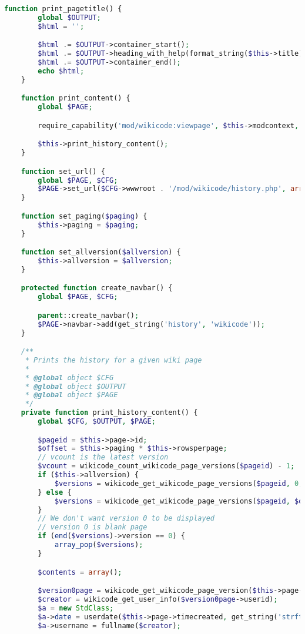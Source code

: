 \begin{lstlisting}[language=PHP]
    function print_pagetitle() {
        global $OUTPUT;
        $html = '';

        $html .= $OUTPUT->container_start();
        $html .= $OUTPUT->heading_with_help(format_string($this->title), 'history', 'wikicode');
        $html .= $OUTPUT->container_end();
        echo $html;
    }

    function print_content() {
        global $PAGE;

        require_capability('mod/wikicode:viewpage', $this->modcontext, NULL, true, 'noviewpagepermission', 'wikicode');

        $this->print_history_content();
    }

    function set_url() {
        global $PAGE, $CFG;
        $PAGE->set_url($CFG->wwwroot . '/mod/wikicode/history.php', array('pageid' => $this->page->id));
    }

    function set_paging($paging) {
        $this->paging = $paging;
    }

    function set_allversion($allversion) {
        $this->allversion = $allversion;
    }

    protected function create_navbar() {
        global $PAGE, $CFG;

        parent::create_navbar();
        $PAGE->navbar->add(get_string('history', 'wikicode'));
    }

    /**
     * Prints the history for a given wiki page
     *
     * @global object $CFG
     * @global object $OUTPUT
     * @global object $PAGE
     */
    private function print_history_content() {
        global $CFG, $OUTPUT, $PAGE;

        $pageid = $this->page->id;
        $offset = $this->paging * $this->rowsperpage;
        // vcount is the latest version
        $vcount = wikicode_count_wikicode_page_versions($pageid) - 1;
        if ($this->allversion) {
            $versions = wikicode_get_wikicode_page_versions($pageid, 0, $vcount);
        } else {
            $versions = wikicode_get_wikicode_page_versions($pageid, $offset, $vcount);
        }
        // We don't want version 0 to be displayed
        // version 0 is blank page
        if (end($versions)->version == 0) {
            array_pop($versions);
        }

        $contents = array();

        $version0page = wikicode_get_wikicode_page_version($this->page->id, 0);
        $creator = wikicode_get_user_info($version0page->userid);
        $a = new StdClass;
        $a->date = userdate($this->page->timecreated, get_string('strftimedaydatetime', 'langconfig'));
        $a->username = fullname($creator);
	

\end{lstlisting}
